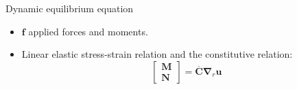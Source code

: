 \documentclass[aspectratio=169]{beamer}
\begin{document}
\begin{frame}{Dynamic equilibrium equation}
\begin{block}{}
\begin{itemize}
            \begin{itemize}
              \item $\rho h$ translational inertia (in the transverse $x_3$-direction),
              \item  $\rho h^3/12$: rotational inertia (about the in-plane $x_1$- and $x_2$-axes).
            \end{itemize}
      \item  $\mathbf f$  applied forces and moments.
      \item  Linear elastic stress-strain relation and the constitutive relation:
            $$\begin{bmatrix}
                \mathbf{M} \\ \mathbf{N}
              \end{bmatrix}=\overline{\boldsymbol{C}}\boldsymbol\nabla_r\mathbf u$$
    \end{itemize}

  \end{block}
\end{frame}
\end{document}
